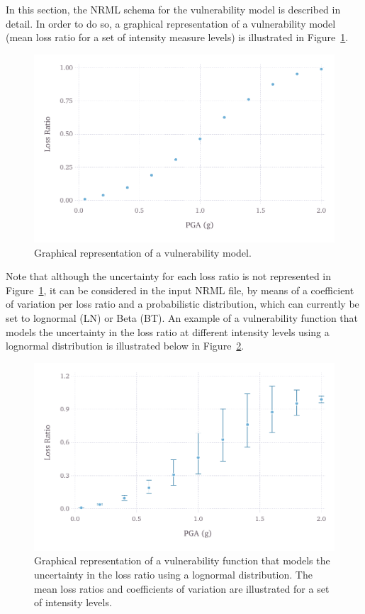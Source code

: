 In this section, the NRML schema for the \gls{vulnerability model} is
described in detail. In order to do so, a graphical representation of a
\gls{vulnerability model} (mean loss ratio for a set of intensity measure
levels) is illustrated in Figure~\ref{fig:vulnerability-zero-cov}.

\begin{figure}[ht]
\centering
\includegraphics[width=12cm]{figures/risk/vulnerability-zero-cov.pdf}
\caption{Graphical representation of a vulnerability model.}
\label{fig:vulnerability-zero-cov}
\end{figure}

Note that although the uncertainty for each loss ratio is not represented in
Figure~\ref{fig:vulnerability-zero-cov}, it can be considered in the input
NRML file, by means of a coefficient of variation per loss ratio and a
probabilistic distribution, which can currently be set to lognormal (LN) or
Beta (BT). An example of a \gls{vulnerability function} that models the 
uncertainty in the loss ratio at different intensity levels using a lognormal
distribution is illustrated below in Figure~\ref{fig:vulnerability-nonzero-cov}.

\begin{figure}[ht]
\centering
\includegraphics[width=12cm]{figures/risk/vulnerability-nonzero-cov.pdf}
\caption{Graphical representation of a vulnerability function that models the uncertainty in the loss ratio using a lognormal distribution. The mean loss ratios and coefficients of variation are illustrated for a set of intensity levels.}
\label{fig:vulnerability-nonzero-cov}
\end{figure}


